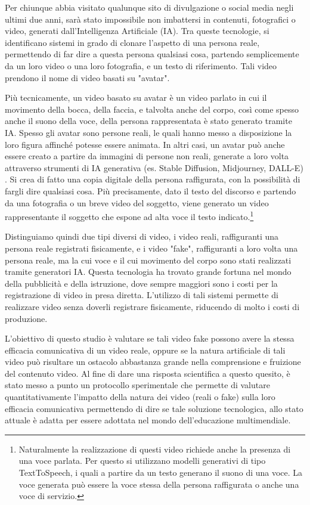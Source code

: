 
Per chiunque abbia visitato qualunque sito di divulgazione o social media negli ultimi due anni, sarà stato impossibile non imbattersi in contenuti, fotografici o video, generati dall'Intelligenza Artificiale (IA). Tra queste tecnologie, si identificano sistemi in grado di clonare l'aspetto di una persona reale, permettendo di far dire a questa persona qualsiasi cosa, partendo semplicemente da un loro video o una loro fotografia, e un testo di riferimento. Tali video prendono il nome di video basati su "avatar".

Più tecnicamente, un video basato su avatar è un video parlato in cui il movimento della bocca, della faccia, e talvolta anche del corpo, così come spesso anche il suono della voce, della persona rappresentata è stato generato tramite IA. Spesso gli avatar sono persone reali, le quali hanno messo a disposizione la loro figura affinché potesse essere animata. In altri casi, un avatar può anche essere creato a partire da immagini di persone non reali, generate a loro volta attraverso strumenti di IA generativa (es. Stable Diffusion, Midjourney, DALL-E) \cite{borji2022generated}. Si crea di fatto una copia digitale della persona raffigurata, con la possibilità di fargli dire qualsiasi cosa. Più precisamente, dato il testo del discorso e partendo da una fotografia o un breve video del soggetto, viene generato un video rappresentante il soggetto che espone ad alta voce il testo indicato.\footnote{Naturalmente la realizzazione di questi video richiede anche la presenza di una voce parlata. Per questo si utilizzano modelli generativi di tipo TextToSpeech, i quali a partire da un testo generano il suono di una voce. La voce generata può essere la voce stessa della persona raffigurata o anche una voce di servizio.}

Distinguiamo quindi due tipi diversi di video, i video reali, raffiguranti una persona reale registrati fisicamente, e i video "fake", raffiguranti a loro volta una persona reale, ma la cui voce e il cui movimento del corpo sono stati realizzati tramite generatori IA. Questa tecnologia ha trovato grande fortuna nel mondo della pubblicità e della istruzione, dove sempre maggiori sono i costi per la registrazione di video in presa diretta. L'utilizzo di tali sistemi permette di realizzare video senza doverli registrare fisicamente, riducendo di molto i costi di produzione. 

L'obiettivo di questo studio è valutare se tali video fake possono avere la stessa efficacia comunicativa di un video reale, oppure se la natura artificiale di tali video può risultare un ostacolo abbastanza grande nella comprensione e fruizione del contenuto video. Al fine di dare una risposta scientifica a questo quesito, è stato messo a punto un protocollo sperimentale che permette di valutare quantitativamente l'impatto della natura dei video (reali o fake) sulla loro efficacia comunicativa permettendo di dire se tale soluzione tecnologica, allo stato attuale è adatta per essere adottata nel mondo dell'educazione multimendiale.

